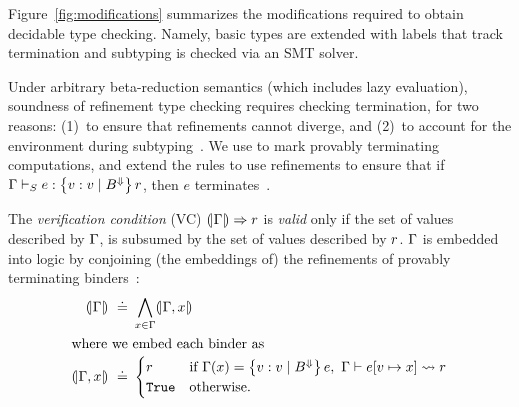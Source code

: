 Figure~\ref{fig:modifications} summarizes the modifications required
to obtain decidable type checking.
%
Namely, basic types are extended with labels that track termination
and subtyping is checked via an SMT solver.

%
Under arbitrary beta-reduction semantics
(which includes lazy evaluation), soundness
of refinement type checking requires checking
termination, for two reasons:
%
(1)~to ensure that refinements cannot diverge, and
(2)~to account for the environment during subtyping~\citep{Vazou14}.
%
We use \tlabel to mark provably terminating
computations, and extend the rules to use
refinements to ensure that if
${\Gamma \vdash_{S} e : \left\lbrace v : v\mid B^\Downarrow\right\rbrace{r}}$,
then $e$ terminates~\citep{Vazou14}.
%


The \emph{verification condition} (VC)
${(\!|\Gamma|\!) \Rightarrow r}$
is \emph{valid} only if the set of values
described by $\Gamma$, is subsumed by
the set of values described by $r$.
%
$\Gamma$ is embedded into logic by conjoining
(the embeddings of) the refinements of
provably terminating binders~\cite{Vazou14}:
%
\begin{align*}
(\!|\Gamma|\!) \ \doteq\  & \bigwedge_{x \in \Gamma} (\!|\Gamma, x|\!) \\
\intertext{where we embed each binder as}
(\!|\Gamma, x|\!) \ \doteq\  & \begin{cases}
                           r  & \text{if } \Gamma(x)=\left\lbrace v : v\mid B^{\Downarrow}\right\rbrace{e},\
                                     \Gamma\vdash e[{{v} \mapsto {x}}] \rightsquigarrow r  \\
                           \mathtt{True} & \text{otherwise}.
                         \end{cases}
\end{align*}


